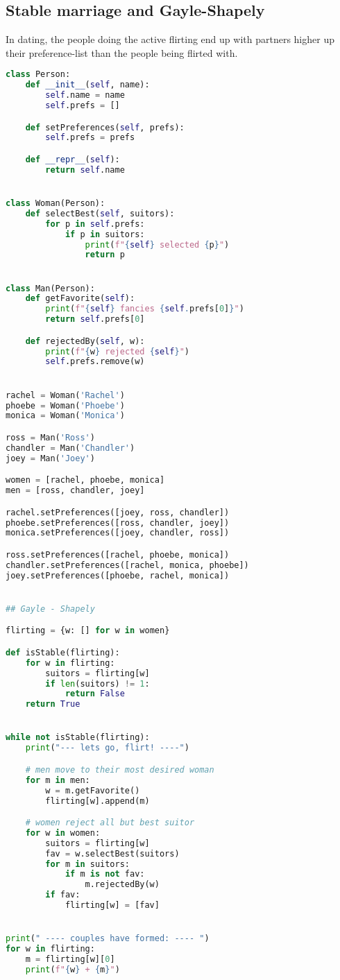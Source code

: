 \subsection{Stable marriage and Gayle-Shapely}
In dating, the people doing the active flirting end up with partners higher up their preference-list than the people being flirted with.
\begin{lstlisting}[language=python]
    class Person:
    def __init__(self, name):
        self.name = name
        self.prefs = []

    def setPreferences(self, prefs):
        self.prefs = prefs

    def __repr__(self):
        return self.name


class Woman(Person):
    def selectBest(self, suitors):
        for p in self.prefs:
            if p in suitors:
                print(f"{self} selected {p}")
                return p


class Man(Person):
    def getFavorite(self):
        print(f"{self} fancies {self.prefs[0]}")
        return self.prefs[0]

    def rejectedBy(self, w):
        print(f"{w} rejected {self}")
        self.prefs.remove(w)


rachel = Woman('Rachel')
phoebe = Woman('Phoebe')
monica = Woman('Monica')

ross = Man('Ross')
chandler = Man('Chandler')
joey = Man('Joey')

women = [rachel, phoebe, monica]
men = [ross, chandler, joey]

rachel.setPreferences([joey, ross, chandler])
phoebe.setPreferences([ross, chandler, joey])
monica.setPreferences([joey, chandler, ross])

ross.setPreferences([rachel, phoebe, monica])
chandler.setPreferences([rachel, monica, phoebe])
joey.setPreferences([phoebe, rachel, monica])


## Gayle - Shapely

flirting = {w: [] for w in women}

def isStable(flirting):
    for w in flirting:
        suitors = flirting[w]
        if len(suitors) != 1:
            return False
    return True


while not isStable(flirting):
    print("--- lets go, flirt! ----")

    # men move to their most desired woman
    for m in men:
        w = m.getFavorite()
        flirting[w].append(m)

    # women reject all but best suitor
    for w in women:
        suitors = flirting[w]
        fav = w.selectBest(suitors)
        for m in suitors:
            if m is not fav:
                m.rejectedBy(w)
        if fav:
            flirting[w] = [fav]


print(" ---- couples have formed: ---- ")
for w in flirting:
    m = flirting[w][0]
    print(f"{w} + {m}")
\end{lstlisting}


